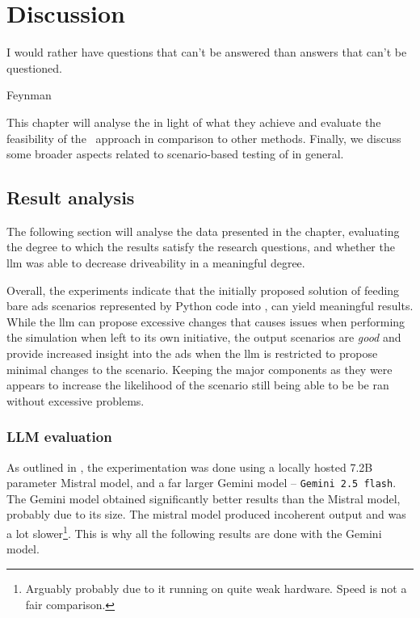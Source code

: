 \chapter{Discussion}\label{chp:discussion}

\epigraph{I would rather have questions that can't be answered than answers that can't be questioned.}{Feynman}

This chapter will analyse the  in light of what they achieve and evaluate the
feasibility of the \hefe~approach in comparison to other methods. Finally, we discuss some broader
aspects related to scenario-based testing of  in general.

\section{Result analysis}\label{sec:resultAnalysis}

The following section will analyse the data presented in the  chapter, evaluating
the degree to which the results satisfy the research questions, and whether the \acrshort{llm} was
able to decrease driveability in a meaningful degree.

Overall, the experiments indicate that the initially proposed solution of feeding
bare \acrshort{ads} scenarios represented by Python code into , can yield meaningful
results.
While the \acrshort{llm} can propose excessive changes that causes issues when performing the
simulation when left to its own initiative, the output scenarios are \emph{good} and provide
increased insight into the \acrshort{ads} when the \acrshort{llm} is restricted to propose minimal
changes to the scenario. Keeping the major components as they were appears to increase the
likelihood of the scenario still being able to be be ran without excessive problems.

\subsection{LLM evaluation}

As outlined in , the experimentation was done using a locally hosted
\num{7.2}B parameter Mistral model, and a far larger Gemini model -- \texttt{Gemini 2.5 flash}. The
Gemini model obtained significantly better results than the Mistral model, probably due to its size.
The mistral model produced incoherent output and was a lot slower\footnote{Arguably probably due to
    it running on quite weak hardware. Speed is not a fair comparison.}. This is why all the following
results are done with the Gemini model.


